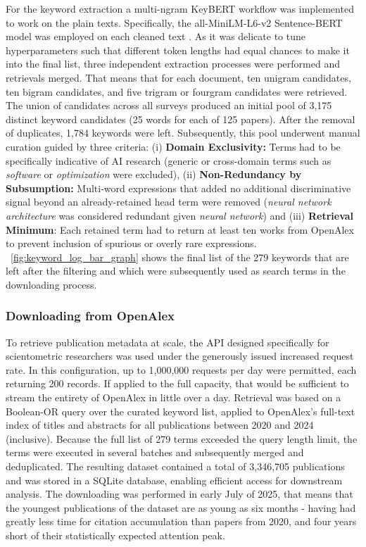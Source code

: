 \documentclass{article}
\begin{document}
	For the keyword extraction a multi-ngram KeyBERT workflow was implemented to work on the plain texts. Specifically, the all-MiniLM-L6-v2 Sentence-BERT model was employed on each cleaned text \cite{reimers2019sentencebert}. As it was delicate to tune hyperparameters such that different token lengths had equal chances to make it into the final list, three independent extraction processes were performed and retrievals merged. That means that for each document, ten unigram candidates, ten bigram candidates, and five trigram or fourgram candidates were retrieved. The union of candidates across all surveys produced an initial pool of 3,175 distinct keyword candidates (25 words for each of 125 papers). After the removal of duplicates, 1,784 keywords were left. Subsequently, this pool underwent manual curation guided by three criteria: (i) \textbf{Domain Exclusivity:} Terms had to be specifically indicative of AI research (generic or cross-domain terms such as \textit{software} or \textit{optimization} were excluded), (ii) \textbf{Non-Redundancy by Subsumption:} Multi-word expressions that added no additional discriminative signal beyond an already-retained head term were removed (\textit{neural network architecture} was considered redundant given \textit{neural network}) and (iii) \textbf{Retrieval Minimum}: Each retained term had to return at least ten works from OpenAlex to prevent inclusion of spurious or overly rare expressions. \figurename~\ref{fig:keyword_log_bar_graph} shows the final list of the 279 keywords that are left after the filtering and which were subsequently used as search terms in the downloading process.
	
	\subsubsection{Downloading from OpenAlex}
	
	To retrieve publication metadata at scale, the API designed specifically for scientometric researchers was used under the generously issued increased request rate. In this configuration, up to 1,000,000 requests per day were permitted, each returning 200 records. If applied to the full capacity, that would be sufficient to stream the entirety of OpenAlex in little over a day. Retrieval was based on a Boolean-OR query over the curated keyword list, applied to OpenAlex’s full-text index of titles and abstracts for all publications between 2020 and 2024 (inclusive). Because the full list of 279 terms exceeded the query length limit, the terms were executed in several batches and subsequently merged and deduplicated. The resulting dataset contained a total of 3,346,705 publications and was stored in a SQLite database, enabling efficient access for downstream analysis. The downloading was performed in early July of 2025, that means that the youngest publications of the dataset are as young as six months - having had greatly less time for citation accumulation than papers from 2020, and four years short of their statistically expected attention peak.
	
\end{document}
